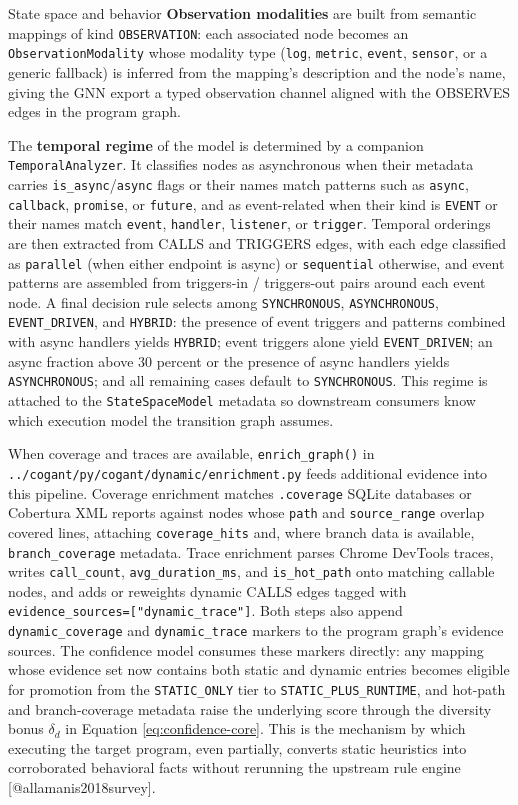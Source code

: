 \documentclass[
  ignorenonframetext,
]{beamer}
\begin{document}
\begin{frame}[fragile]{State space and behavior}
\textbf{Observation modalities} are built from semantic mappings of kind
\texttt{OBSERVATION}: each associated node becomes an
\texttt{ObservationModality} whose modality type (\texttt{log},
\texttt{metric}, \texttt{event}, \texttt{sensor}, or a generic fallback)
is inferred from the mapping's description and the node's name, giving
the GNN export a typed observation channel aligned with the OBSERVES
edges in the program graph.

The \textbf{temporal regime} of the model is determined by a companion
\texttt{TemporalAnalyzer}. It classifies nodes as asynchronous when
their metadata carries \texttt{is\_async}/\texttt{async} flags or their
names match patterns such as \texttt{async}, \texttt{callback},
\texttt{promise}, or \texttt{future}, and as event-related when their
kind is \texttt{EVENT} or their names match \texttt{event},
\texttt{handler}, \texttt{listener}, or \texttt{trigger}. Temporal
orderings are then extracted from CALLS and TRIGGERS edges, with each
edge classified as \texttt{parallel} (when either endpoint is async) or
\texttt{sequential} otherwise, and event patterns are assembled from
triggers-in / triggers-out pairs around each event node. A final
decision rule selects among \texttt{SYNCHRONOUS}, \texttt{ASYNCHRONOUS},
\texttt{EVENT\_DRIVEN}, and \texttt{HYBRID}: the presence of event
triggers and patterns combined with async handlers yields
\texttt{HYBRID}; event triggers alone yield \texttt{EVENT\_DRIVEN}; an
async fraction above 30 percent or the presence of async handlers yields
\texttt{ASYNCHRONOUS}; and all remaining cases default to
\texttt{SYNCHRONOUS}. This regime is attached to the
\texttt{StateSpaceModel} metadata so downstream consumers know which
execution model the transition graph assumes.

When coverage and traces are available, \texttt{enrich\_graph()} in
\texttt{../cogant/py/cogant/dynamic/enrichment.py} feeds additional
evidence into this pipeline. Coverage enrichment matches
\texttt{.coverage} SQLite databases or Cobertura XML reports against
nodes whose \texttt{path} and \texttt{source\_range} overlap covered
lines, attaching \texttt{coverage\_hits} and, where branch data is
available, \texttt{branch\_coverage} metadata. Trace enrichment parses
Chrome DevTools traces, writes \texttt{call\_count},
\texttt{avg\_duration\_ms}, and \texttt{is\_hot\_path} onto matching
callable nodes, and adds or reweights dynamic CALLS edges tagged with
\texttt{evidence\_sources={[}"dynamic\_trace"{]}}. Both steps also
append \texttt{dynamic\_coverage} and \texttt{dynamic\_trace} markers to
the program graph's evidence sources. The confidence model consumes
these markers directly: any mapping whose evidence set now contains both
static and dynamic entries becomes eligible for promotion from the
\texttt{STATIC\_ONLY} tier to \texttt{STATIC\_PLUS\_RUNTIME}, and
hot-path and branch-coverage metadata raise the underlying score through
the diversity bonus \(\delta_d\) in Equation \ref{eq:confidence-core}.
This is the mechanism by which executing the target program, even
partially, converts static heuristics into corroborated behavioral facts
without rerunning the upstream rule engine {[}@allamanis2018survey{]}.
\end{frame}
\end{document}

